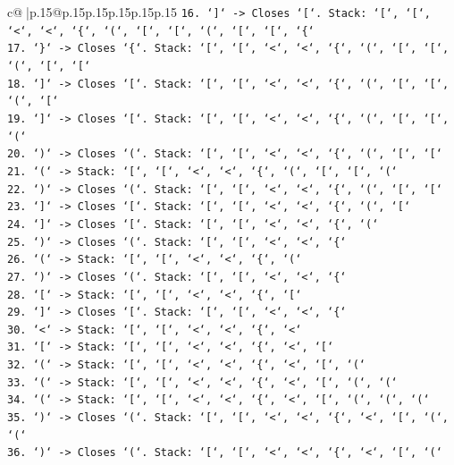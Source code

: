 \documentclass{article}
\begin{document}
{\begin{supertabular}{c@{$\;$}|p{.15\linewidth}@{}p{.15\linewidth}p{.15\linewidth}p{.15\linewidth}p{.15\linewidth}p{.15\linewidth}}
{{{\texttt{16. `{]}` {-}> Closes `{[}`. Stack: `{[}`, `{[}`, `<`, `<`, `\{`, `(`, `{[}`, `{[}`, `(`, `{[}`, `{[}`, `\{`} \\
\texttt{17. `\}` {-}> Closes `\{`. Stack: `{[}`, `{[}`, `<`, `<`, `\{`, `(`, `{[}`, `{[}`, `(`, `{[}`, `{[}`} \\
\texttt{18. `{]}` {-}> Closes `{[}`. Stack: `{[}`, `{[}`, `<`, `<`, `\{`, `(`, `{[}`, `{[}`, `(`, `{[}`} \\
\texttt{19. `{]}` {-}> Closes `{[}`. Stack: `{[}`, `{[}`, `<`, `<`, `\{`, `(`, `{[}`, `{[}`, `(`} \\
\texttt{20. `)` {-}> Closes `(`. Stack: `{[}`, `{[}`, `<`, `<`, `\{`, `(`, `{[}`, `{[}`} \\
\texttt{21. `(` {-}> Stack: `{[}`, `{[}`, `<`, `<`, `\{`, `(`, `{[}`, `{[}`, `(`} \\
\texttt{22. `)` {-}> Closes `(`. Stack: `{[}`, `{[}`, `<`, `<`, `\{`, `(`, `{[}`, `{[}`} \\
\texttt{23. `{]}` {-}> Closes `{[}`. Stack: `{[}`, `{[}`, `<`, `<`, `\{`, `(`, `{[}`} \\
\texttt{24. `{]}` {-}> Closes `{[}`. Stack: `{[}`, `{[}`, `<`, `<`, `\{`, `(`} \\
\texttt{25. `)` {-}> Closes `(`. Stack: `{[}`, `{[}`, `<`, `<`, `\{`} \\
\texttt{26. `(` {-}> Stack: `{[}`, `{[}`, `<`, `<`, `\{`, `(`} \\
\texttt{27. `)` {-}> Closes `(`. Stack: `{[}`, `{[}`, `<`, `<`, `\{`} \\
\texttt{28. `{[}` {-}> Stack: `{[}`, `{[}`, `<`, `<`, `\{`, `{[}`} \\
\texttt{29. `{]}` {-}> Closes `{[}`. Stack: `{[}`, `{[}`, `<`, `<`, `\{`} \\
\texttt{30. `<` {-}> Stack: `{[}`, `{[}`, `<`, `<`, `\{`, `<`} \\
\texttt{31. `{[}` {-}> Stack: `{[}`, `{[}`, `<`, `<`, `\{`, `<`, `{[}`} \\
\texttt{32. `(` {-}> Stack: `{[}`, `{[}`, `<`, `<`, `\{`, `<`, `{[}`, `(`} \\
\texttt{33. `(` {-}> Stack: `{[}`, `{[}`, `<`, `<`, `\{`, `<`, `{[}`, `(`, `(`} \\
\texttt{34. `(` {-}> Stack: `{[}`, `{[}`, `<`, `<`, `\{`, `<`, `{[}`, `(`, `(`, `(`} \\
\texttt{35. `)` {-}> Closes `(`. Stack: `{[}`, `{[}`, `<`, `<`, `\{`, `<`, `{[}`, `(`, `(`} \\
\texttt{36. `)` {-}> Closes `(`. Stack: `{[}`, `{[}`, `<`, `<`, `\{`, `<`, `{[}`, `(`} \\
}}}
\end{supertabular}}
\end{document}
